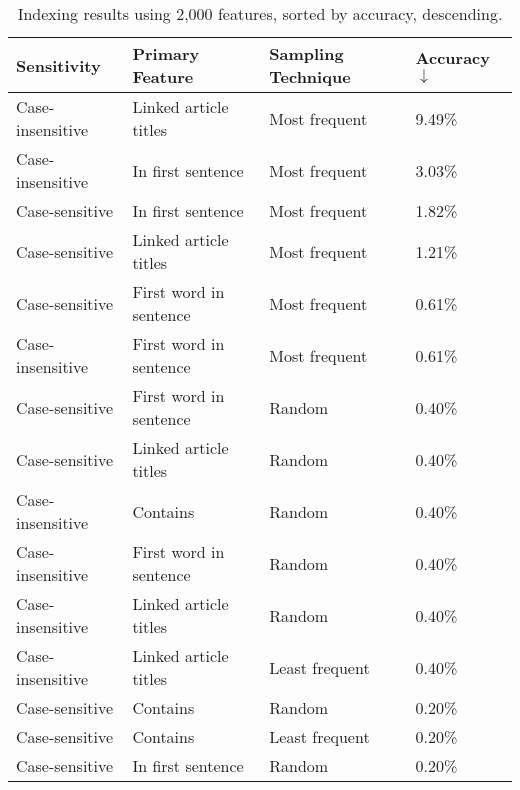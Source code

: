 \pagebreak
\begin{center}
\begin{table}[h]
\caption{Indexing results using 2,000 features, sorted by accuracy, descending.}
\begin{tabular}{llll}
\label{tab:results-sorted}
\textbf{Sensitivity} & \textbf{Primary Feature}       & \textbf{Sampling Technique} & \textbf{Accuracy $\downarrow$} \\ \hline
Case-insensitive     & Linked article titles  & Most frequent               & 9.49\%             \\ \hline
Case-insensitive     & In first sentence      & Most frequent               & 3.03\%             \\ \hline
Case-sensitive       & In first sentence      & Most frequent               & 1.82\%             \\ \hline
Case-sensitive       & Linked article titles  & Most frequent               & 1.21\%             \\ \hline
Case-sensitive       & First word in sentence & Most frequent               & 0.61\%             \\ \hline
Case-insensitive     & First word in sentence & Most frequent               & 0.61\%             \\ \hline
Case-sensitive       & First word in sentence & Random                      & 0.40\%             \\ \hline
Case-sensitive       & Linked article titles  & Random                      & 0.40\%             \\ \hline
Case-insensitive     & Contains               & Random                      & 0.40\%             \\ \hline
Case-insensitive     & First word in sentence & Random                      & 0.40\%             \\ \hline
Case-insensitive     & Linked article titles  & Random                      & 0.40\%             \\ \hline
Case-insensitive     & Linked article titles  & Least frequent              & 0.40\%             \\ \hline
Case-sensitive       & Contains               & Random                      & 0.20\%             \\ \hline
Case-sensitive       & Contains               & Least frequent              & 0.20\%             \\ \hline
Case-sensitive       & In first sentence      & Random                      & 0.20\%             \\ \hline

\end{tabular}
\end{table}
\end{center}
